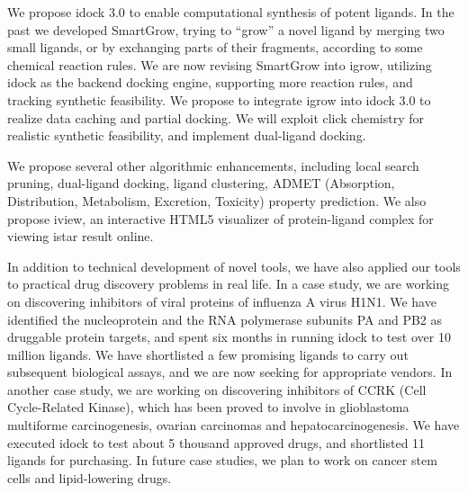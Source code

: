 We propose idock 3.0 to enable computational synthesis of potent ligands. In the past we developed SmartGrow, trying to ``grow'' a novel ligand by merging two small ligands, or by exchanging parts of their fragments, according to some chemical reaction rules. We are now revising SmartGrow into igrow, utilizing idock as the backend docking engine, supporting more reaction rules, and tracking synthetic feasibility. We propose to integrate igrow into idock 3.0 to realize data caching and partial docking. We will exploit click chemistry for realistic synthetic feasibility, and implement dual-ligand docking.

We propose several other algorithmic enhancements, including local search pruning, dual-ligand docking, ligand clustering, ADMET (Absorption, Distribution, Metabolism, Excretion, Toxicity) property prediction. We also propose iview, an interactive HTML5 visualizer of protein-ligand complex for viewing istar result online.

In addition to technical development of novel tools, we have also applied our tools to practical drug discovery problems in real life. In a case study, we are working on discovering inhibitors of viral proteins of influenza A virus H1N1. We have identified the nucleoprotein and the RNA polymerase subunits PA and PB2 as druggable protein targets, and spent six months in running idock to test over 10 million ligands. We have shortlisted a few promising ligands to carry out subsequent biological assays, and we are now seeking for appropriate vendors. In another case study, we are working on discovering inhibitors of CCRK (Cell Cycle-Related Kinase), which has been proved to involve in glioblastoma multiforme carcinogenesis, ovarian carcinomas and hepatocarcinogenesis. We have executed idock to test about 5 thousand approved drugs, and shortlisted 11 ligands for purchasing. In future case studies, we plan to work on cancer stem cells and lipid-lowering drugs.
